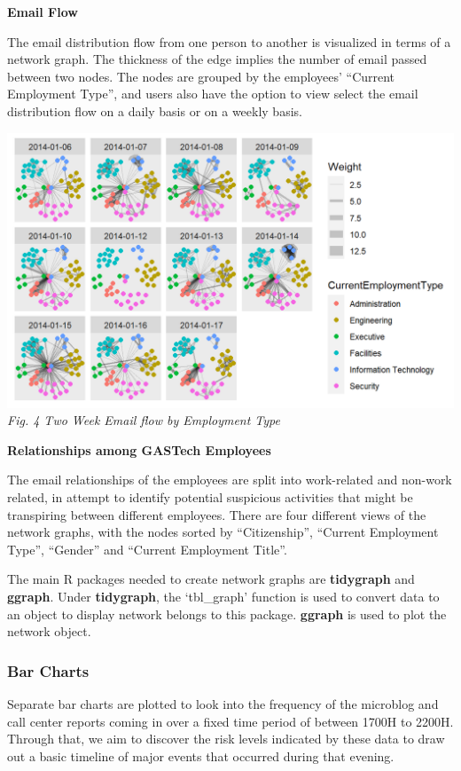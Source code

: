 \documentclass{acm_proc_article-sp}
\begin{document}
\textbf{Email Flow}

The email distribution flow from one person to another is visualized in
terms of a network graph. The thickness of the edge implies the number
of email passed between two nodes. The nodes are grouped by the
employees' ``Current Employment Type'', and users also have the option
to view select the email distribution flow on a daily basis or on a
weekly basis.

\includegraphics{img/image09.png} \emph{Fig. 4 Two Week Email flow by
Employment Type}

\textbf{Relationships among GASTech Employees}

The email relationships of the employees are split into work-related and
non-work related, in attempt to identify potential suspicious activities
that might be transpiring between different employees. There are four
different views of the network graphs, with the nodes sorted by
``Citizenship'', ``Current Employment Type'', ``Gender'' and ``Current
Employment Title''.

The main R packages needed to create network graphs are
\textbf{tidygraph} and \textbf{ggraph}. Under \textbf{tidygraph}, the
`tbl\_graph' function is used to convert data to an object to display
network belongs to this package. \textbf{ggraph} is used to plot the
network object.

\hypertarget{bar-charts}{%
\subsubsection{Bar Charts}\label{bar-charts}}

Separate bar charts are plotted to look into the frequency of the
microblog and call center reports coming in over a fixed time period of
between 1700H to 2200H. Through that, we aim to discover the risk levels
indicated by these data to draw out a basic timeline of major events
that occurred during that evening.
\end{document}
